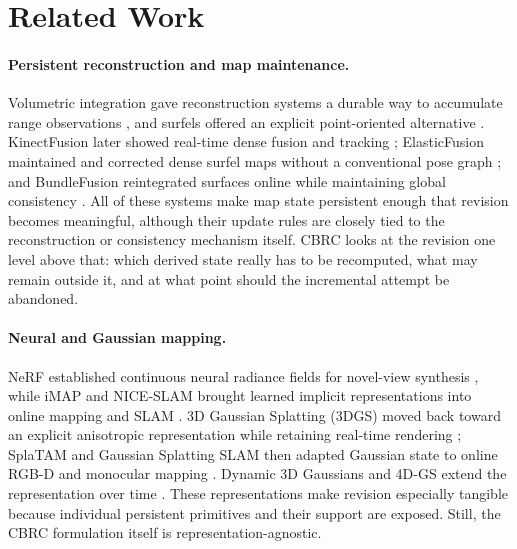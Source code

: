 \documentclass[acmtog,nonacm]{acmart}
\newcommand{\method}{CBRC}
\begin{document}
\section{Related Work}
\paragraph{Persistent reconstruction and map maintenance.}
Volumetric integration gave reconstruction systems a durable way to accumulate range observations \citep{curless1996volumetric}, and surfels offered an explicit point-oriented alternative \citep{pfister2000surfels}. KinectFusion later showed real-time dense fusion and tracking \citep{newcombe2011kinectfusion}; ElasticFusion maintained and corrected dense surfel maps without a conventional pose graph \citep{whelan2015elasticfusion}; and BundleFusion reintegrated surfaces online while maintaining global consistency \citep{dai2017bundlefusion}. All of these systems make map state persistent enough that revision becomes meaningful, although their update rules are closely tied to the reconstruction or consistency mechanism itself. \method{} looks at the revision one level above that: which derived state really has to be recomputed, what may remain outside it, and at what point should the incremental attempt be abandoned.

\paragraph{Neural and Gaussian mapping.}
NeRF established continuous neural radiance fields for novel-view synthesis \citep{mildenhall2020nerf}, while iMAP and NICE-SLAM brought learned implicit representations into online mapping and SLAM \citep{sucar2021imap,zhu2022niceslam}. 3D Gaussian Splatting (3DGS) moved back toward an explicit anisotropic representation while retaining real-time rendering \citep{kerbl2023gaussians}; SplaTAM and Gaussian Splatting SLAM then adapted Gaussian state to online RGB-D and monocular mapping \citep{keetha2024splatam,matsuki2024monogs}. Dynamic 3D Gaussians and 4D-GS extend the representation over time \citep{luiten2024dynamic3dgaussians,wu2024fourDGS}. These representations make revision especially tangible because individual persistent primitives and their support are exposed. Still, the \method{} formulation itself is representation-agnostic.
\end{document}
